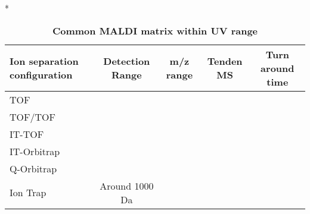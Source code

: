 \begin{table}{*}
\caption{\textbf{Common MALDI matrix within UV range}}
\label{tab:matrix}

\centering 
\scriptsize

\begin{tabular}{|l|c|c|c|c|}
    \hline 
    \textbf{Ion separation configuration} & \textbf{Detection Range} & \textbf{m/z range} & \textbf{Tenden MS} & \textbf{Turn around time} \\ 
    \hline
    TOF & \\
    TOF/TOF \\
    IT-TOF \\
    IT-Orbitrap \\
    Q-Orbitrap \\
    Ion Trap & Around 1000 Da \\
    \hline \hline 
\end{tabular}
\end{table}